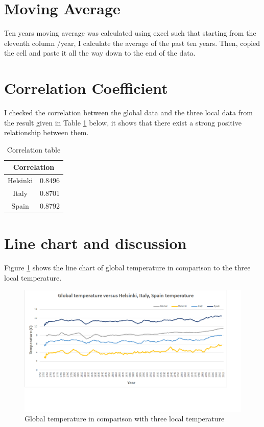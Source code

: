 \documentclass[10pt,a4paper]{article}
\begin{document}
\section*{Moving Average}
Ten years moving average was calculated using excel such that starting from the eleventh column /year, I calculate the average of the past ten years. Then, copied the cell and paste it all the way down to the end of the data. 


\section*{Correlation Coefficient}
I checked the correlation between the global data and the three local data from the result given in Table \ref{table1} below, it shows that there exist a strong positive relationship between them.

\begin{table}
\centering
\begin{tabular}{|c|c|}
\hline 
\multicolumn{2}{|c|}{Correlation} \\ 
\hline 
Helsinki & 0.8496 \\ 
\hline 
Italy & 0.8701 \\ 
\hline 
Spain & 0.8792 \\ 
\hline 
\end{tabular} 
\caption{Correlation table}
\label{table1}
\end{table}

\section*{Line chart and discussion}
Figure \ref{fig1} shows the line chart of global temperature in comparison to the three local temperature.

\begin{figure}[!h]
\includegraphics[scale=0.75]{Globaltemp.png} 
\caption{Global temperature in comparison with three local temperature}
\label{fig1}
\end{figure}
\end{document}
